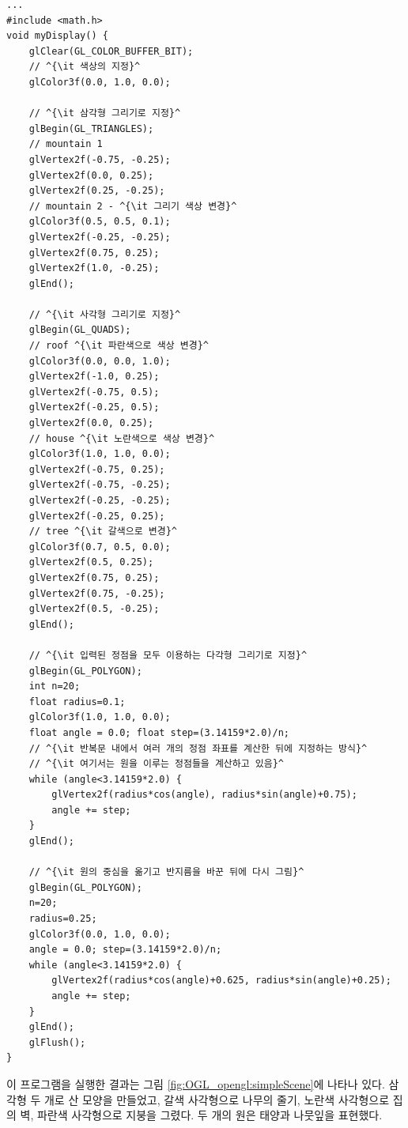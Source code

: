 \begin{algorithmbis}\label{code:OGL_opengl:simpleScene}
\lstset{language=C++, escapechar=^} 
\begin{lstlisting}
...
#include <math.h>
void myDisplay() {
    glClear(GL_COLOR_BUFFER_BIT);
    // ^{\it 색상의 지정}^
    glColor3f(0.0, 1.0, 0.0);    

    // ^{\it 삼각형 그리기로 지정}^
    glBegin(GL_TRIANGLES);
    // mountain 1
    glVertex2f(-0.75, -0.25);
    glVertex2f(0.0, 0.25);
    glVertex2f(0.25, -0.25);
    // mountain 2 - ^{\it 그리기 색상 변경}^
    glColor3f(0.5, 0.5, 0.1);
    glVertex2f(-0.25, -0.25);
    glVertex2f(0.75, 0.25);
    glVertex2f(1.0, -0.25);
    glEnd();

    // ^{\it 사각형 그리기로 지정}^
    glBegin(GL_QUADS);
    // roof ^{\it 파란색으로 색상 변경}^
    glColor3f(0.0, 0.0, 1.0);
    glVertex2f(-1.0, 0.25);
    glVertex2f(-0.75, 0.5);
    glVertex2f(-0.25, 0.5);
    glVertex2f(0.0, 0.25);
    // house ^{\it 노란색으로 색상 변경}^
    glColor3f(1.0, 1.0, 0.0);
    glVertex2f(-0.75, 0.25);
    glVertex2f(-0.75, -0.25);
    glVertex2f(-0.25, -0.25);
    glVertex2f(-0.25, 0.25);
    // tree ^{\it 갈색으로 변경}^
    glColor3f(0.7, 0.5, 0.0);
    glVertex2f(0.5, 0.25);
    glVertex2f(0.75, 0.25);
    glVertex2f(0.75, -0.25);
    glVertex2f(0.5, -0.25);
    glEnd();

    // ^{\it 입력된 정점을 모두 이용하는 다각형 그리기로 지정}^
    glBegin(GL_POLYGON);
    int n=20;
    float radius=0.1;
    glColor3f(1.0, 1.0, 0.0);
    float angle = 0.0; float step=(3.14159*2.0)/n;
    // ^{\it 반복문 내에서 여러 개의 정점 좌표를 계산한 뒤에 지정하는 방식}^
    // ^{\it 여기서는 원을 이루는 정점들을 계산하고 있음}^
    while (angle<3.14159*2.0) {
        glVertex2f(radius*cos(angle), radius*sin(angle)+0.75);
        angle += step;
    }
    glEnd();

    // ^{\it 원의 중심을 옮기고 반지름을 바꾼 뒤에 다시 그림}^
    glBegin(GL_POLYGON);
    n=20;
    radius=0.25;
    glColor3f(0.0, 1.0, 0.0);
    angle = 0.0; step=(3.14159*2.0)/n;
    while (angle<3.14159*2.0) {
        glVertex2f(radius*cos(angle)+0.625, radius*sin(angle)+0.25);
        angle += step;
    } 
    glEnd();
    glFlush();
}
\end{lstlisting}
\end{algorithmbis}

이 프로그램을 실행한 결과는 그림 \ref{fig:OGL_opengl:simpleScene}에 나타나 있다.  삼각형 두 개로 산 모양을 만들었고,
갈색 사각형으로 나무의 줄기, 노란색 사각형으로 집의 벽, 파란색 사각형으로 지붕을 그렸다.
두 개의 원은 태양과 나뭇잎을 표현했다.

